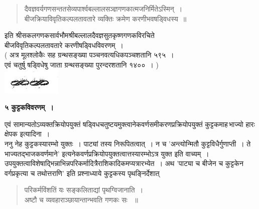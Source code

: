 \documentclass[11pt, openany]{book}
\begin{document}
{{\begin{quote}
    \qt दैवज्ञवर्यगणसन्ततसेव्यपार्श्वबल्लालसञ्ज्ञगणकात्मजनिर्मितेऽस्मिन्~। \\
बीजक्रियाविवृतिकल्पलतावतारे व्यक्तिः क्रमेण करणीभवषड्विधस्य~॥
\end{quote}

\begin{center}
इति श्रीसकलगणकसार्वभौमश्रीबल्लालदैवज्ञसुतकृष्णगणकविरचिते \\
बीजविवृतिकल्पलतावतारे करणीषड्विधविवरणम्~।\\

( अत्र मूलश्लोकैः सह ग्रन्थसङ्ख्या पञ्चनवत्यधिकपञ्चशतानि ५९५~।\\
 एवं चतुर्षु षड्विधेषु जाता ग्रन्थसङ्ख्या पुरन्दरशतानि १४००~। )\\

\vspace{10mm}
    \includegraphics[scale=0.8]{graphics/Capture34.png}
\end{center} 
\newpage
 \label{ch5}
\begin{center}
{\LARGE \textbf{५ कुट्टकविवरणम्~।}}
\end{center}

\vspace{2mm}
एवं सामान्यतोऽव्यक्तक्रियोपयुक्तं षड्विधचतुष्टयमुक्त्वानेकवर्णसमीकरणप्रक्रियोपयुक्तं
कुट्टकमाह\textendash \,भाज्यो हारः क्षेपक इत्यादिना~।\\

\vspace{-4mm}
 ननु नेह कुट्टकस्यारम्भो युक्तः~। पाट्यां तस्य निरूपितत्वात्~। न च 
{\qt 'अन्त्योन्मितौ कुट्टविधैर्गुणाप्ती~। ते भाज्यतद्भाजकवर्णमाने'}
इत्यनेकवर्णप्रक्रियोपयुक्तत्वात्तस्यारम्भोऽत्र युक्त इति वाच्यम्~।
उपयुक्तत्वाविशेषाद्भिन्नाभिन्नपरिकर्मादित्रैराशिकादिकमप्यत्रारभ्येत~। अथ {\qt 'पाट्या च बीजेन च कुट्टकेन वर्गप्रकृत्या च तथोत्तराणि'} इति
प्रश्नाध्याये कुट्टकस्य पृथङ्निर्देशात्
\begin{quote}
    \q
    परिकर्मविंशतिं यः सङ्कलिताद्यां पृथग्विजानाति~।\\
अष्टौ च व्यवहाराञ्छायान्तान्भवति गणकः सः ~॥~

\end{quote}

}}
\end{document}
